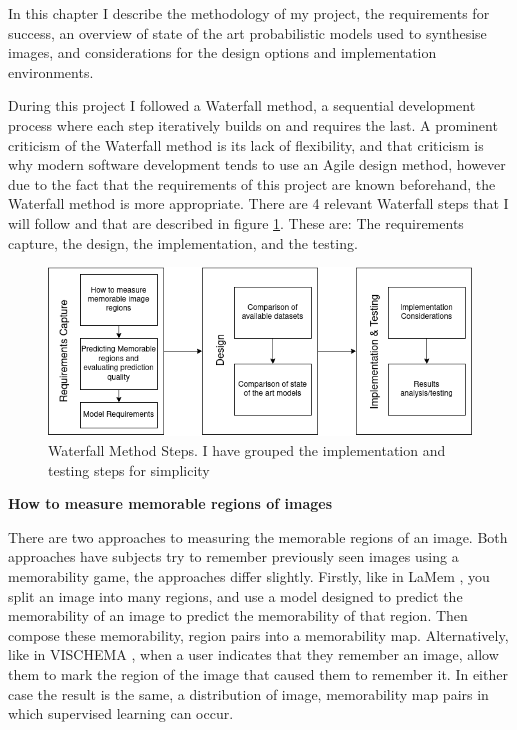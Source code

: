 \documentclass{UoYCSproject}
\begin{document}
In this chapter I describe the methodology of my project, the requirements for success, an overview of state of the art probabilistic models used to synthesise images, and considerations for the design options and implementation environments. 

During this project I followed a Waterfall method, a sequential development process where each step iteratively builds on and requires the last. A prominent criticism of the Waterfall method is its lack of flexibility, and that criticism is why modern software development tends to use an Agile design method, however due to the fact that the requirements of this project are known beforehand, the Waterfall method is more appropriate. There are 4 relevant Waterfall steps that I will follow and that are described in figure \ref{fig:waterfall method}. These are: The requirements capture, the design, the implementation, and the testing.

\begin{figure}[ht]
    \centering
    \includegraphics[width=\linewidth]{Waterfall Model}
    \caption{Waterfall Method Steps. I have grouped the implementation and testing steps for simplicity}
    \label{fig:waterfall method}
\end{figure}

\textbf{How to measure memorable regions of images}

There are two approaches to measuring the memorable regions of an image. Both approaches have subjects try to remember previously seen images using a memorability game, the approaches differ slightly. Firstly, like in LaMem \cite{ICCV15_Khosla}, you split an image into many regions, and use a model designed to predict the memorability of an image to predict the memorability of that region. Then compose these memorability, region pairs into a memorability map. 
Alternatively, like in VISCHEMA \cite{VischemaPaper}, when a user indicates that they remember an image, allow them to mark the region of the image that caused them to remember it. 
In either case the result is the same, a distribution of image, memorability map pairs in which supervised learning can occur.
\end{document}

